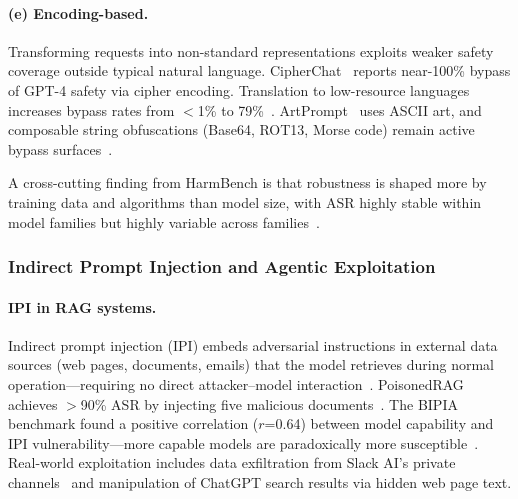 \paragraph{(e) Encoding-based.}
Transforming requests into non-standard representations exploits weaker safety coverage outside typical natural language. CipherChat~\cite{yuan2024cipherchat} reports near-100\% bypass of GPT-4 safety via cipher encoding. Translation to low-resource languages increases bypass rates from $<$1\% to 79\%~\cite{yong2023lowresource,deng2024multilingual}. ArtPrompt~\cite{jiang2024artprompt} uses ASCII art, and composable string obfuscations (Base64, ROT13, Morse code) remain active bypass surfaces~\cite{huang2024plentiful}.

A cross-cutting finding from HarmBench is that robustness is shaped more by training data and algorithms than model size, with ASR highly stable within model families but highly variable across families~\cite{mazeika2024harmbench}.


\subsubsection{Indirect Prompt Injection and Agentic Exploitation}
\label{sec:threat-ipi}

\paragraph{IPI in RAG systems.}
Indirect prompt injection (IPI) embeds adversarial instructions in external data sources (web pages, documents, emails) that the model retrieves during normal operation---requiring no direct attacker--model interaction~\cite{greshake2023ipi}. PoisonedRAG achieves $>$90\% ASR by injecting five malicious documents~\cite{zou2025poisonedrag}. The BIPIA benchmark found a positive correlation ($r$=0.64) between model capability and IPI vulnerability---more capable models are paradoxically more susceptible~\cite{yi2025bipia}. Real-world exploitation includes data exfiltration from Slack AI's private channels~\cite{promptarmor2024slack} and manipulation of ChatGPT search results via hidden web page text.

